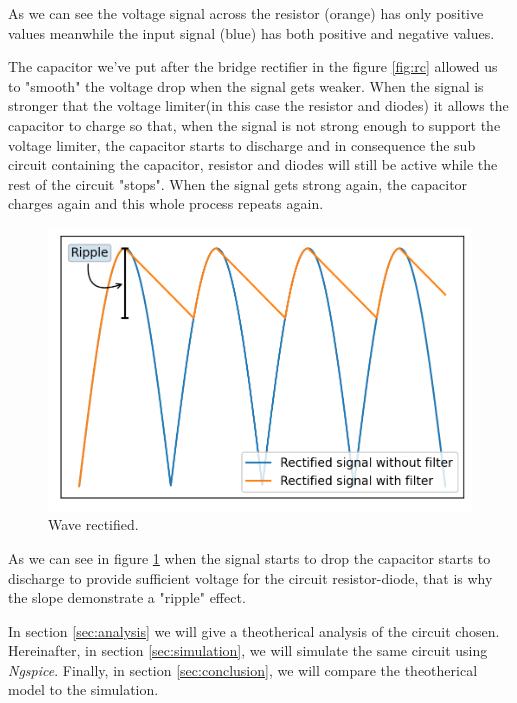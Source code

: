 As we can see the voltage signal across the resistor (orange) has only positive values
meanwhile the input signal (blue) has both positive and negative values.

The capacitor we've put after the bridge rectifier in the figure \ref{fig:rc} allowed us to "smooth"
the voltage drop when the signal gets weaker. When the signal is stronger that the voltage limiter(in this case the resistor and diodes)
it allows the capacitor to charge so that, when the signal is not strong enough to support the voltage limiter, the capacitor
starts to discharge and in consequence the sub circuit containing the capacitor, resistor and diodes will still be
active while the rest of the circuit "stops". When the signal gets strong again, the capacitor charges again and this whole process repeats again.
\begin{figure}[h] \centering
    \includegraphics[scale=0.75]{filter.png}
    \caption{Wave rectified.}
    \label{fig:rc5}
\end{figure}

As we can see in figure \ref{fig:rc5} when the signal starts to drop the capacitor starts to discharge to provide
sufficient voltage for the circuit resistor-diode, that is why the slope demonstrate a "ripple" effect.

In section \ref{sec:analysis} we will give a theotherical analysis of the circuit chosen.
Hereinafter, in section \ref{sec:simulation}, we will simulate the same circuit using \emph{Ngspice}.
Finally, in section \ref{sec:conclusion}, we will compare the theotherical model to the simulation.

